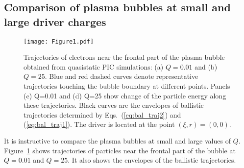 \documentclass[twocolumn,showpacs,aip]{revtex4}
\begin{document}
\subsection{Comparison of plasma bubbles at small and large driver charges}
\begin{figure}[t]
\centering
  \texttt{[image: Figure1.pdf]}\\
\caption{Trajectories of electrons near the frontal part of the plasma bubble obtained from quasistatic PIC simulations: (a)  $Q=0.01$ and (b) $Q=25$. Blue and red dashed curves denote representative trajectories  touching the bubble boundary at different points. Panels (c)  Q=0.01 and (d) Q=25 show  change of the particle energy along these trajectories.
Black curves  are the envelopes of ballistic trajectories  determined by Eqs.~(\ref{eq:bal_traj2}) and (\ref{eq:bal_traj1}).  The driver is located at the point $(\xi,r)=(0,0)$.
 }
\label{fig:traj}
\end{figure}  


  
It is instructive to compare  the plasma bubbles at small and large values of $Q$.  Figure~\ref{fig:traj} shows trajectories of particles near the frontal part of the  bubble 
 at  $Q=0.01$ and $Q=25$.
It  also shows the envelopes of the ballistic trajectories.
 
\end{document}
